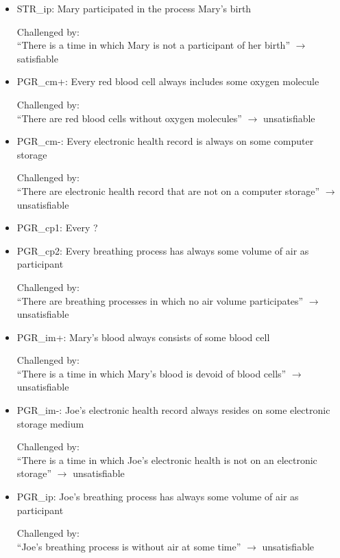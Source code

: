 \begin{itemize}
\item STR\_ip:  Mary participated in the process Mary's birth

Challenged by: \\``There is a time in which Mary is not a participant of her birth''  $\rightarrow$ satisfiable



\item PGR\_cm+: Every red blood cell always includes some oxygen molecule 

Challenged by: \\``There are red blood cells without oxygen molecules''  $\rightarrow$ unsatisfiable


\item PGR\_cm-: Every electronic health record is always on some computer storage

Challenged by: \\``There are electronic health record that are not on a computer storage''  $\rightarrow$ unsatisfiable


\item PGR\_cp1: Every ?  

\item PGR\_cp2: Every breathing process has always some volume of air as participant 

Challenged by: \\``There are breathing processes in which no air volume participates''  $\rightarrow$ unsatisfiable


\item PGR\_im+: Mary's blood always consists of some blood cell 

Challenged by: \\``There is a time in which Mary's blood is devoid of blood cells''  $\rightarrow$ unsatisfiable

\item PGR\_im-: Joe's electronic health record always resides on some electronic storage medium

Challenged by: \\``There is a time in which Joe's electronic health is not on an electronic storage''  $\rightarrow$ unsatisfiable


\item PGR\_ip:  Joe's breathing process has always some volume of air as participant

Challenged by: \\``Joe's breathing process is without air at some time''  $\rightarrow$ unsatisfiable


\end{itemize}
